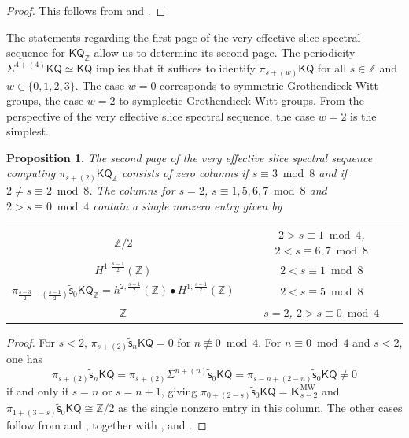 \documentclass[11pt,hyp,english]{article}
\newcommand{\Z}{\mathbb{Z}}
\newcommand{\KQ}{\mathsf{KQ}}
\newcommand{\vs}{\tilde{\mathsf{s}}}
\newcommand{\KMW}{\mathbf{K}^\mathrm{MW}}
\let\iso=\cong
\newtheorem{proposition}[theorem]{Proposition}
\theoremstyle{definition}
\begin{document}
\begin{proof}
    This follows from  and .
\end{proof}

The statements regarding the first page of the very effective slice spectral sequence for $\KQ_\Z$ allow us to determine its second page.
The periodicity $\Sigma^{4+(4)}\KQ\simeq \KQ$ implies that it suffices to 
identify $\pi_{s+(w)}\KQ$ for all $s\in \Z$ and $w\in \{0,1,2,3\}$.
The case $w=0$ corresponds to symmetric Grothendieck-Witt groups, the case $w=2$ to symplectic Grothendieck-Witt groups.
From the perspective of the very effective slice spectral sequence, the case $w=2$ is the simplest.

\begin{proposition}\label{prop:2ndpageweight2KQ}
The second page of the very effective slice spectral sequence 
computing $\pi_{s+(2)}\KQ_\Z$ consists of zero columns if 
$s\equiv 3\bmod 8$ and if $2\neq s\equiv 2\bmod 8$.
The columns for $s=2$, $s\equiv 1,5,6,7 \bmod 8$ and $2>s\equiv 0\bmod 4$ 
contain a single nonzero entry given by 
\begin{center}
\begin{tabular}{|c|c|}
\hline
$\Z/2$ & $2>s\equiv 1\bmod 4$, $2<s\equiv 6,7 \bmod 8$\\
$H^{1,\frac{s-1}{2}}(\Z)$ & $2<s\equiv 1 \bmod 8$ \\
$\pi_{\tfrac{s-3}{2}-(\tfrac{s-1}{2})}\vs_0\KQ_\Z= h^{2,\frac{s+1}{2}}(\Z)\bullet H^{1,\frac{s-1}{2}}(\Z)$ &  $2<s\equiv 5\bmod 8$ \\
$\Z$ & $s=2$, $2>s\equiv 0 \bmod 4$ \\
\hline
\end{tabular}
\end{center}
\end{proposition}

\begin{proof}
For $s<2$, $\pi_{s+(2)}\vs_n\KQ=0$ for $n\not\equiv 0\bmod 4$.
For $n\equiv 0 \bmod 4$ and $s<2$, one has 
\[ \pi_{s+(2)}\vs_{n}\KQ=\pi_{s+(2)}\Sigma^{n+(n)}\vs_0\KQ=\pi_{s-n+(2-n)}\vs_0\KQ\neq 0 \]
if and only if $s=n$ or $s=n+1$, giving $\pi_{0+(2-s)}\vs_0\KQ = \KMW_{s-2}$ and $\pi_{1+(3-s)}\vs_0\KQ\iso \Z/2$ as the single nonzero entry in this column.
The other cases follow from  and , together with ,  and .
\end{proof}
\end{document}
